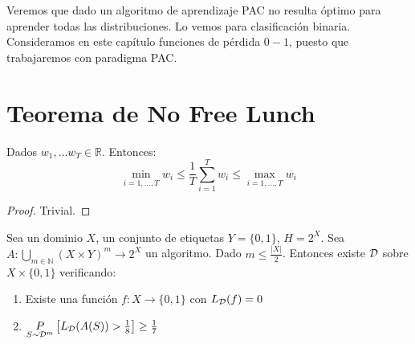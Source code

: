 Veremos que dado un algoritmo de aprendizaje PAC no resulta óptimo para aprender todas las distribuciones. 
Lo vemos para clasificación binaria. Consideramos en este capítulo funciones de pérdida $0-1$, puesto que
trabajaremos con paradigma PAC.

\section{Teorema de No Free Lunch}
\begin{lemma}
 Dados $w_1, \ldots w_T \in \mathbb{R}$. Entonces:
 \[
   \min_{i = 1,\ldots ,T} w_i \le \frac{1}{T} \sum_{i=1}^T w_i \le \max_{i = 1,\ldots,T} w_i
 \]
 \label{lemma:nfl-ineqs}
\end{lemma}

\begin{proof}
 Trivial.
\end{proof}

\begin{theorem}
Sea un dominio $X$, un conjunto de etiquetas $Y=\{0,1\}$, $H = 2^X$. 
Sea $A: \underset{m\in \mathbb{N}}{\bigcup} (X\times Y)^m \rightarrow 2^X$ un algoritmo. Dado $m \le \frac{|X|}{2}$.
Entonces existe $\mathcal{D}$ sobre $X\times \{0,1\}$ verificando:
\begin{enumerate}[i]
\item Existe una función $f: X \rightarrow \{0,1\}$ con $L_{\mathcal{D}}(f)=0$
\item $\underset{S\sim \mathcal{D}^m}{P} \left[ L_{\mathcal{D}}(A(S)) > \frac{1}{8} \right] \ge \frac{1}{7}$
\end{enumerate}

\label{th:nfl}
\end{theorem}

